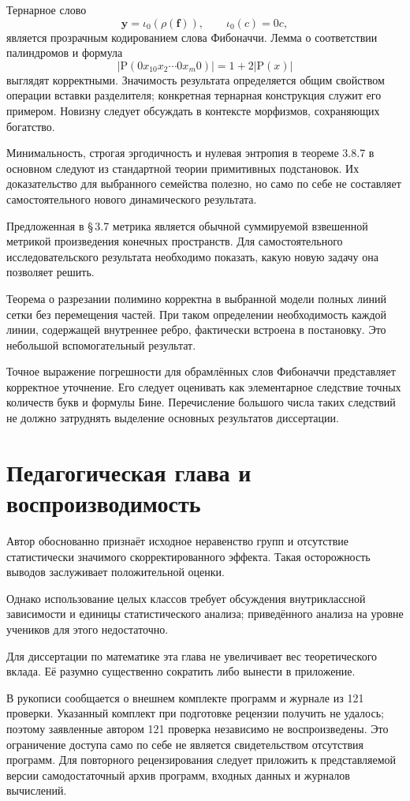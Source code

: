 \documentclass[12pt,a4paper]{article}
\begin{document}
Тернарное слово
\[
  \mathbf y=\iota_0(\rho(\mathbf f)),\qquad \iota_0(c)=0c,
\]
является прозрачным кодированием слова Фибоначчи. Лемма о соответствии
палиндромов и формула
\[
  |\mathrm P(0x_10x_2\cdots0x_m0)|=1+2|\mathrm P(x)|
\]
выглядят корректными. Значимость результата определяется общим
свойством операции вставки разделителя; конкретная тернарная
конструкция служит его примером. Новизну следует обсуждать
в контексте морфизмов, сохраняющих богатство.

Минимальность, строгая эргодичность и нулевая энтропия
в теореме 3.8.7 в основном следуют из стандартной теории примитивных
подстановок. Их доказательство для выбранного семейства полезно,
но само по себе не составляет самостоятельного нового динамического
результата.

Предложенная в \S\,3.7 метрика является обычной суммируемой
взвешенной метрикой произведения конечных пространств.
Для самостоятельного исследовательского результата необходимо показать,
какую новую задачу она позволяет решить.

Теорема о разрезании полимино корректна в выбранной модели полных
линий сетки без перемещения частей. При таком определении необходимость
каждой линии, содержащей внутреннее ребро, фактически встроена
в постановку. Это небольшой вспомогательный результат.

Точное выражение погрешности для обрамлённых слов Фибоначчи
представляет корректное уточнение. Его следует оценивать как
элементарное следствие точных количеств букв и формулы Бине.
Перечисление большого числа таких следствий не должно затруднять
выделение основных результатов диссертации.

\section{Педагогическая глава и воспроизводимость}

Автор обоснованно признаёт исходное неравенство групп и отсутствие
статистически значимого скорректированного эффекта. Такая осторожность
выводов заслуживает положительной оценки.

Однако использование целых классов требует обсуждения внутриклассной
зависимости и единицы статистического анализа; приведённого анализа
на уровне учеников для этого недостаточно.

Для диссертации по математике эта глава не увеличивает вес
теоретического вклада. Её разумно существенно сократить либо
вынести в приложение.

В рукописи сообщается о внешнем комплекте программ и журнале
из 121 проверки. Указанный комплект при подготовке рецензии получить
не удалось; поэтому заявленные автором 121 проверка независимо
не воспроизведены. Это ограничение доступа само по себе не является
свидетельством отсутствия программ. Для повторного рецензирования
следует приложить к представляемой версии самодостаточный архив
программ, входных данных и журналов вычислений.
\end{document}
